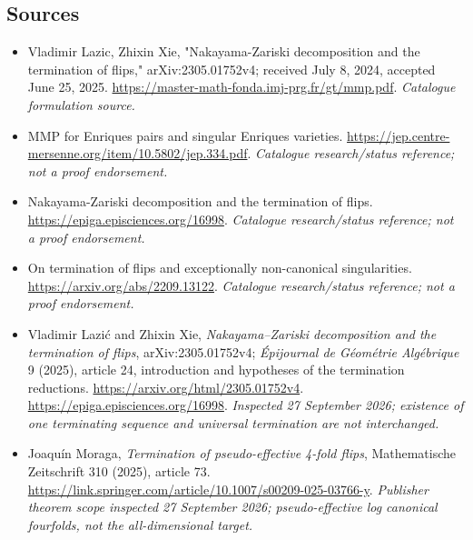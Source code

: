 \documentclass[11pt,a4paper]{article}
\numberwithin{equation}{section}
\begin{document}
\needspace{170mm}
\subsection{Sources}
\begin{itemize}\raggedright
\item[\textnormal{[S1]}]\hypertarget{source:statement:1}{} Vladimir Lazic, Zhixin Xie, "Nakayama-Zariski decomposition and the termination of flips," arXiv:2305.01752v4; received July 8, 2024, accepted June 25, 2025.
\url{https://master-math-fonda.imj-prg.fr/gt/mmp.pdf}.
{\small\textit{Catalogue formulation source.}}
\item[\textnormal{[S2]}]\hypertarget{source:statement:2}{} MMP for Enriques pairs and singular Enriques varieties.
\url{https://jep.centre-mersenne.org/item/10.5802/jep.334.pdf}.
{\small\textit{Catalogue research/status reference; not a proof endorsement.}}
\item[\textnormal{[S3]}]\hypertarget{source:statement:3}{} Nakayama-Zariski decomposition and the termination of flips.
\url{https://epiga.episciences.org/16998}.
{\small\textit{Catalogue research/status reference; not a proof endorsement.}}
\item[\textnormal{[S4]}]\hypertarget{source:statement:4}{} On termination of flips and exceptionally non-canonical singularities.
\url{https://arxiv.org/abs/2209.13122}.
{\small\textit{Catalogue research/status reference; not a proof endorsement.}}
\item[\textnormal{[E1]}]\hypertarget{extra:statement:1}{} Vladimir Lazi\'c and
Zhixin Xie, \emph{Nakayama--Zariski decomposition and the termination of flips},
arXiv:2305.01752v4; \emph{\'Epijournal de G\'eom\'etrie Alg\'ebrique} 9 (2025),
article 24, introduction and hypotheses of the termination reductions.
\url{https://arxiv.org/html/2305.01752v4}.
\url{https://epiga.episciences.org/16998}.
{\small\textit{Inspected 27 September 2026; existence of one terminating
sequence and universal termination are not interchanged.}}
\item[\textnormal{[E2]}]\hypertarget{extra:statement:2}{} Joaqu\'in Moraga,
\emph{Termination of pseudo-effective 4-fold flips},
Mathematische Zeitschrift 310 (2025), article 73.
\url{https://link.springer.com/article/10.1007/s00209-025-03766-y}.
{\small\textit{Publisher theorem scope inspected 27 September 2026;
pseudo-effective log canonical fourfolds, not the all-dimensional target.}}
\end{itemize}
\end{document}
